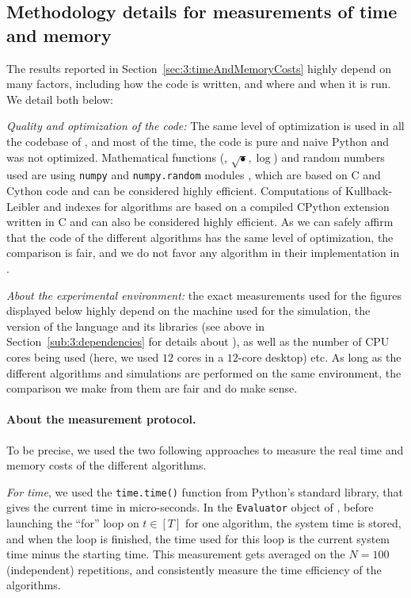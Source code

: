 \subsection{Methodology details for measurements of time and memory}
\label{sub:3:precautionsTimeMemory}

The results reported in Section~\ref{sec:3:timeAndMemoryCosts} highly depend on many factors, including how the code is written, and where and when it is run.
We detail both below:

    \emph{Quality and optimization of the code:}
    The same level of optimization is used in all the codebase of \SMPyBandits, and most of the time, the code is pure and naive Python and was not optimized.
    Mathematical functions (\eg, $\sqrt{\bullet}, \log$) and random numbers used are using \texttt{numpy} and \texttt{numpy.random} modules \cite{numpy}, which are based on C and Cython code \cite{cython} and can be considered highly efficient.
    Computations of Kullback-Leibler and indexes for \klUCB{} algorithms are based on a compiled CPython extension written in C \cite{python} and can also be considered highly efficient.
    As we can safely affirm that the code of the different algorithms has the same level of optimization, the comparison is fair, and we do not favor any algorithm in their implementation in \SMPyBandits.

    \emph{About the experimental environment:}
    the exact measurements used for the figures displayed below highly depend on the machine used for the simulation, the version of the language and its libraries (see above in Section~\ref{sub:3:dependencies} for details about \SMPyBandits), as well as the number of CPU cores being used (here, we used $12$ cores in a $12$-core desktop) etc.
    As long as the different algorithms and simulations are performed on the same environment, the comparison we make from them are fair and do make sense.


\paragraph{About the measurement protocol.}
%
To be precise, we used the two following approaches to measure the real time and memory costs of the different algorithms.

    \emph{For time}, we used the \texttt{time.time()} function from Python's standard library, that gives the current time in micro-seconds.
    In the \texttt{Evaluator} object of \SMPyBandits, before launching the ``for'' loop on $t\in[T]$ for one algorithm, the system time is stored, and when the loop is finished, the time used for this loop is the current system time minus the starting time.
    This measurement gets averaged on the $N=100$ (independent) repetitions, and consistently measure the time efficiency of the algorithms.

